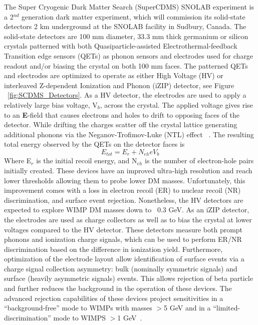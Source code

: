 The Super Cryogenic Dark Matter Search (SuperCDMS) SNOLAB experiment is a 2$^{nd}$ generation dark matter experiment, which will commission its solid-state detectors 2 km underground at the SNOLAB facility in Sudbury, Canada. The solid-state detectors are 100 mm diameter, 33.3 mm thick germanium or silicon crystals patterned with both Quasiparticle-assisted Electrothermal-feedback Transition edge sensors (QETs) as phonon sensors and electrodes used for charge readout and/or biasing the crystal on both 100 mm faces. The patterned QETs and electrodes are optimized to operate as either High Voltage (HV) or interleaved Z-dependent Ionization and Phonon (iZIP) detector, see Figure ~\ref{fig:SCDMS_Detectors}. 
As a HV detector, the electrodes are used to apply a relatively large bias voltage, V$_b$, across the crystal. The applied voltage gives rise to an \textbf{E}-field that causes electrons and holes to drift to opposing faces of the detector. While drifting the charges scatter off the crystal lattice generating additional phonons via the Neganov-Trofimov-Luke (NTL) effect ~\cite{Neganov1985, Luke1988}. The resulting total energy observed by the QETs on the detector faces is
\begin{equation}
    E_{tot} = E_r + N_{eh}eV_{b}
\end{equation}
Where E$_r$ is the initial recoil energy, and N$_{eh}$ is the number of electron-hole pairs initially created. These devices have an improved ultra-high resolution and reach lower thresholds allowing them to probe lower DM masses. Unfortunately, this improvement comes with a loss in electron recoil (ER) to nuclear recoil (NR) discrimination, and surface event rejection. Nonetheless, the HV detectors are expected to explore WIMP DM masses down to ~0.3 GeV. 
As an iZIP detector, the electrodes are used as charge collectors as well as to bias the crystal at lower voltages compared to the HV detector. These detectors measure both prompt phonons and ionization charge signals, which can be used to perform ER/NR discrimination based on the difference in ionization yield. Furthermore, optimization of the electrode layout allow identification of surface events via a charge signal collection asymmetry: bulk (nominally symmetric signals) and surface (heavily asymmetric signals) events. This allows rejection of beta particle and further reduces the background in the operation of these devices. The advanced rejection capabilities of these devices project sensitivities in a “background-free” mode to WIMPs with masses $>$5 GeV and in a “limited-discrimination” mode to WIMPS $>$1 GeV~\cite{SCDMS2017}.

